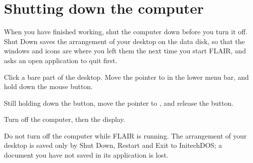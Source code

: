 \section{Shutting down the computer}
When you have finished working, shut the computer down before you turn it
off.  Shut Down saves the arrangement of your desktop on the data disk, so
that the windows and icons are where you left them the next time you start
FLAIR, and asks an open application to quit first.
\begin{TaskSteps}
\Step Click a bare part of the desktop.
\Step Move the pointer to  in the lower menu bar, and
hold down the mouse button.
\end{TaskSteps}


\begin{TaskSteps}[resume]
\Step Still holding down the button, move the pointer to , and release the button.
\end{TaskSteps}


\begin{TaskSteps}[resume]
\Step Turn off the computer, then the display.
\end{TaskSteps}

\begin{MacWarning}
Do not turn off the computer while FLAIR is running.  The arrangement of
your desktop is saved only by Shut Down, Restart and Exit to InitechDOS; a
document you have not saved in its application is lost.
\end{MacWarning}

